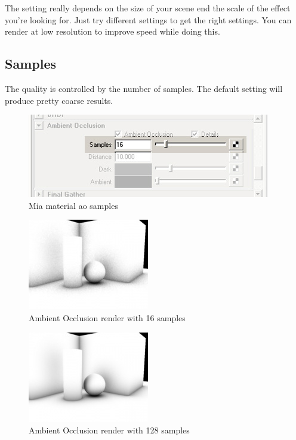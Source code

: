 \documentclass[10pt,a4paper]{article}
\begin{document}
The setting really depends on the size of your scene end the scale of the effect you're looking for. Just try different settings to get the right settings. You can render at low resolution to improve speed while doing this.

\subsection{Samples}
The quality is controlled by the number of samples. The default setting will produce pretty coarse results.

\begin{figure}[tbh]
\centering
\includegraphics[width=0.5\linewidth]{figure/Mia_material_ao_samples}
\caption{Mia material ao samples}
\label{fig:miamaterialaosamples}
\end{figure}

\begin{figure}[tbh]
\centering
\includegraphics[width=0.5\linewidth]{figure/Amb_occlusion_example_16samples}
\caption{Ambient Occlusion render with 16 samples}
\label{fig:ambocclusionexample16samples}
\end{figure}

\begin{figure}[tbh]
\centering
\includegraphics[width=0.5\linewidth]{figure/Amb_occlusion_example_128samples}
\caption{Ambient Occlusion render with 128 samples}
\label{fig:ambocclusionexample128samples}
\end{figure}
\end{document}
